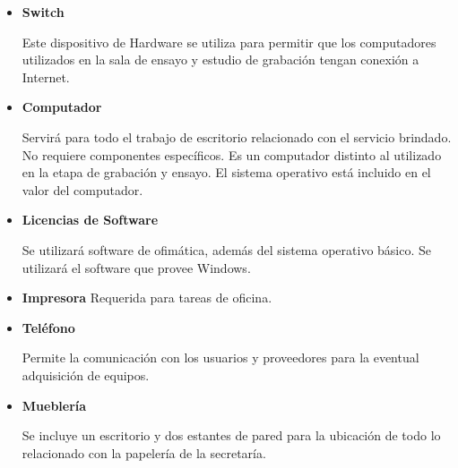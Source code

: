 \begin{itemize}
	\item \textbf{Switch}

		Este dispositivo de Hardware se utiliza para
		permitir que los computadores utilizados en la sala
		de ensayo y estudio de grabación tengan conexión a
		Internet.

	\item \textbf{Computador}

		Servirá para todo el trabajo de
		escritorio relacionado con el servicio brindado.
		No requiere componentes específicos. Es un computador
		distinto al utilizado en la etapa de grabación y
		ensayo. El sistema operativo está incluido en el valor
		del computador.

	\item \textbf{Licencias de Software}

		Se utilizará software de ofimática, 
		además del sistema operativo básico. Se utilizará
		el software que provee Windows. 

	\item \textbf{Impresora}
		Requerida para tareas de oficina.

	\item \textbf{Teléfono}

		Permite la comunicación con los usuarios
		y proveedores para la eventual adquisición de 
		equipos.

	\item \textbf{Mueblería}

		Se incluye un escritorio y dos estantes
		de pared para la ubicación de todo lo
		relacionado con la papelería de la secretaría.
\end{itemize}
	

